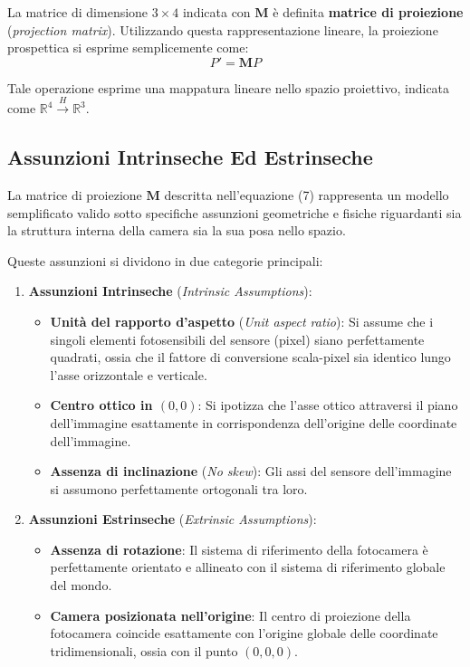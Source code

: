 ﻿\documentclass[11pt, a4paper]{article}
\begin{document}
La matrice di dimensione $3 \times 4$ indicata con $\bm{M}$ è definita \textbf{matrice di proiezione} (\emph{projection matrix}). Utilizzando questa rappresentazione lineare, la proiezione prospettica si esprime semplicemente come:
\begin{equation}
    \boxed{P' = \bm{M} P}
\end{equation}

Tale operazione esprime una mappatura lineare nello spazio proiettivo, indicata come $\mathbb{R}^4 \overset{H}{\rightarrow} \mathbb{R}^3$.



\subsection{Assunzioni Intrinseche Ed Estrinseche}

La matrice di proiezione $\bm{M}$ descritta nell'equazione (7) rappresenta un modello semplificato valido sotto specifiche assunzioni geometriche e fisiche riguardanti sia la struttura interna della camera sia la sua posa nello spazio.

Queste assunzioni si dividono in due categorie principali:
\begin{enumerate}[noitemsep]
    \item \textbf{Assunzioni Intrinseche} (\emph{Intrinsic Assumptions}):
    \begin{itemize}[noitemsep]
        \item \textbf{Unità del rapporto d'aspetto} (\emph{Unit aspect ratio}): Si assume che i singoli elementi fotosensibili del sensore (pixel) siano perfettamente quadrati, ossia che il fattore di conversione scala-pixel sia identico lungo l'asse orizzontale e verticale.
        \item \textbf{Centro ottico in $(0,0)$}: Si ipotizza che l'asse ottico attraversi il piano dell'immagine esattamente in corrispondenza dell'origine delle coordinate dell'immagine.
        \item \textbf{Assenza di inclinazione} (\emph{No skew}): Gli assi del sensore dell'immagine si assumono perfettamente ortogonali tra loro.
    \end{itemize}
    \item \textbf{Assunzioni Estrinseche} (\emph{Extrinsic Assumptions}):
    \begin{itemize}[noitemsep]
        \item \textbf{Assenza di rotazione}: Il sistema di riferimento della fotocamera è perfettamente orientato e allineato con il sistema di riferimento globale del mondo.
        \item \textbf{Camera posizionata nell'origine}: Il centro di proiezione della fotocamera coincide esattamente con l'origine globale delle coordinate tridimensionali, ossia con il punto $(0, 0, 0)$.
    \end{itemize}
\end{enumerate}
\end{document}
